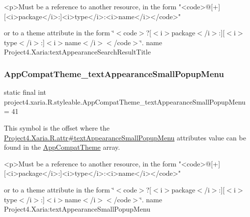 \begin{DoxyVerb}      <p>Must be a reference to another resource, in the form "<code>@[+][<i>package</i>:]<i>type</i>:<i>name</i></code>"
\end{DoxyVerb}
 or to a theme attribute in the form \char`\"{}$<$code$>$?\mbox{[}$<$i$>$package$<$/i$>$\+:\mbox{]}\mbox{[}$<$i$>$type$<$/i$>$\+:\mbox{]}$<$i$>$name$<$/i$>$$<$/code$>$\char`\"{}.  name Project4.\+Xaria\+:text\+Appearance\+Search\+Result\+Title \mbox{\label{classproject4_1_1xaria_1_1R_1_1styleable_a0b2edd58e797e1a0b12ec98975f7b355}} 
\subsubsection{\texorpdfstring{App\+Compat\+Theme\+\_\+text\+Appearance\+Small\+Popup\+Menu}{AppCompatTheme\_textAppearanceSmallPopupMenu}}
{\footnotesize\ttfamily static final int project4.\+xaria.\+R.\+styleable.\+App\+Compat\+Theme\+\_\+text\+Appearance\+Small\+Popup\+Menu = 41\hspace{0.3cm}{\ttfamily [static]}}

This symbol is the offset where the \hyperlink{}{Project4.\+Xaria.\+R.\+attr\#text\+Appearance\+Small\+Popup\+Menu} attribute\textquotesingle{}s value can be found in the \hyperlink{classproject4_1_1xaria_1_1R_1_1styleable_aad8bec413e2350f9404e6ff0e831a85d}{App\+Compat\+Theme} array.

\begin{DoxyVerb}      <p>Must be a reference to another resource, in the form "<code>@[+][<i>package</i>:]<i>type</i>:<i>name</i></code>"
\end{DoxyVerb}
 or to a theme attribute in the form \char`\"{}$<$code$>$?\mbox{[}$<$i$>$package$<$/i$>$\+:\mbox{]}\mbox{[}$<$i$>$type$<$/i$>$\+:\mbox{]}$<$i$>$name$<$/i$>$$<$/code$>$\char`\"{}.  name Project4.\+Xaria\+:text\+Appearance\+Small\+Popup\+Menu \mbox{\label{classproject4_1_1xaria_1_1R_1_1styleable_aea2ca8637844e7e15e92fc8a9341e92d}} 
